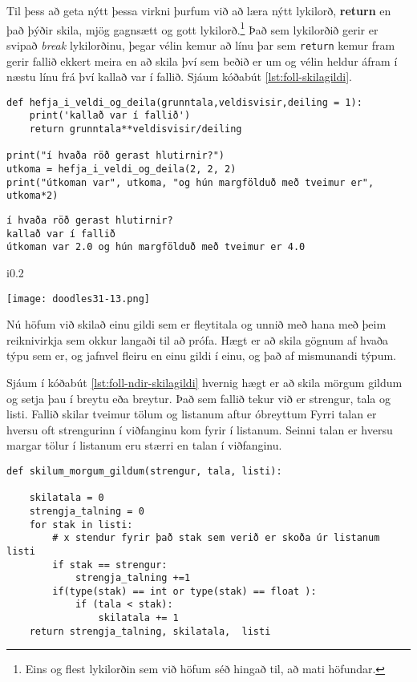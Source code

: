 Til þess að geta nýtt þessa virkni þurfum við að læra nýtt lykilorð, \textbf{return} en það þýðir skila, mjög gagnsætt og gott lykilorð.\footnote{Eins og flest lykilorðin sem við höfum séð hingað til, að mati höfundar.}
Það sem lykilorðið gerir er svipað \emph{break} lykilorðinu, þegar vélin kemur að línu þar sem \texttt{return} kemur fram gerir fallið ekkert meira en að skila því sem beðið er um og vélin heldur áfram í næstu línu frá því kallað var í fallið.
Sjáum kóðabút \ref{lst:foll-skilagildi}.

\begin{lstlisting}[caption=Hvernig á að láta fall skila gildi með return skipuninni, label=lst:foll-skilagildi]
def hefja_i_veldi_og_deila(grunntala,veldisvisir,deiling = 1):
	print('kallað var í fallið')
	return grunntala**veldisvisir/deiling
	
print("í hvaða röð gerast hlutirnir?")
utkoma = hefja_i_veldi_og_deila(2, 2, 2)
print("útkoman var", utkoma, "og hún margfölduð með tveimur er", utkoma*2)
\end{lstlisting}
\lstset{style=uttak}
\begin{lstlisting}
í hvaða röð gerast hlutirnir?
kallað var í fallið
útkoman var 2.0 og hún margfölduð með tveimur er 4.0
\end{lstlisting}
\lstset{style=venjulegt}

\phantom{easter egg}
\begin{wrapfigure}{i}{0.2\textwidth} %
	\begin{center}
		\texttt{[image: doodles31-13.png]}
	\end{center}
\end{wrapfigure}
 
Nú höfum við skilað einu gildi sem er fleytitala og unnið með hana með þeim reiknivirkja sem okkur langaði til að prófa.
Hægt er að skila gögnum af hvaða týpu sem er, og jafnvel fleiru en einu gildi í einu, og það af mismunandi týpum.

Sjáum í kóðabút \ref{lst:foll-ndir-skilagildi} hvernig hægt er að skila mörgum gildum og setja þau í breytu eða breytur.
Það sem fallið tekur við er strengur, tala og listi.
Fallið skilar tveimur tölum og listanum aftur óbreyttum
Fyrri talan er hversu oft strengurinn í viðfanginu kom fyrir í listanum.
Seinni talan er hversu margar tölur í listanum eru stærri en talan í viðfanginu.


\begin{lstlisting}[caption=Hvernig á að skila mörgum gildum, label=lst:foll-ndir-skilagildi]
def skilum_morgum_gildum(strengur, tala, listi):

	skilatala = 0
	strengja_talning = 0
	for stak in listi:
		# x stendur fyrir það stak sem verið er skoða úr listanum listi
		if stak == strengur:
			strengja_talning +=1
		if(type(stak) == int or type(stak) == float ):
			if (tala < stak):
				skilatala += 1
	return strengja_talning, skilatala,  listi
\end{lstlisting}


